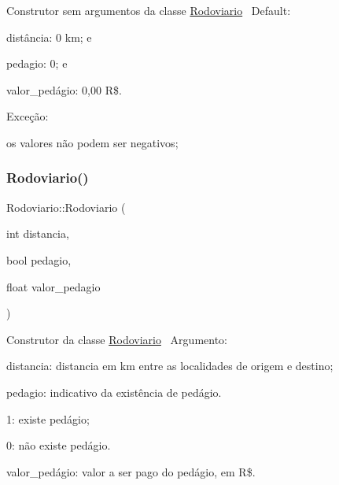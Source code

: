 Construtor sem argumentos da classe \hyperlink{classRodoviario}{Rodoviario}~\newline
 Default\+:~\newline

\begin{DoxyItemize}
\item distância\+: 0 km; e
\item pedagio\+: 0; e
\item valor\+\_\+pedágio\+: 0,00 R\$.~\newline

\end{DoxyItemize}

Exceção\+:
\begin{DoxyItemize}
\item os valores não podem ser negativos;
\end{DoxyItemize}\mbox{\label{classRodoviario_a56cdc15643e5d023e2d4c61139ecc16d}} 
\subsubsection{\texorpdfstring{Rodoviario()}{Rodoviario()}\hspace{0.1cm}{\footnotesize\ttfamily [2/2]}}
{\footnotesize\ttfamily Rodoviario\+::\+Rodoviario (\begin{DoxyParamCaption}\item[{int}]{distancia,  }\item[{bool}]{pedagio,  }\item[{float}]{valor\+\_\+pedagio }\end{DoxyParamCaption})}

Construtor da classe \hyperlink{classRodoviario}{Rodoviario}~\newline
 Argumento\+:
\begin{DoxyItemize}
\item distancia\+: distancia em km entre as localidades de origem e destino;
\item pedagio\+: indicativo da existência de pedágio.
\begin{DoxyItemize}
\item 1\+: existe pedágio;
\item 0\+: não existe pedágio.
\end{DoxyItemize}
\item valor\+\_\+pedágio\+: valor a ser pago do pedágio, em R\$.~\newline

\end{DoxyItemize}\mbox{\label{classRodoviario_a11df25b437139f12013adc0d861b7970}} 
